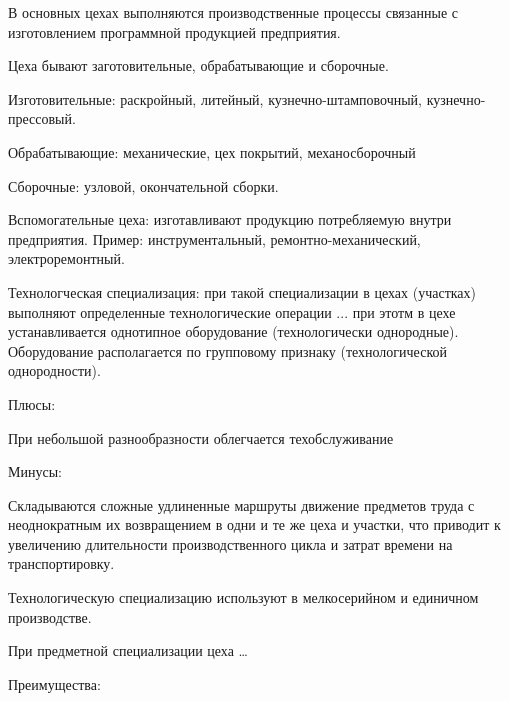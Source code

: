 \documentclass[14pt,a4paper,oneside]{extarticle}
\begin{document}
В основных цехах выполняются производственные процессы связанные с изготовлением программной продукцией предприятия.

Цеха бывают заготовительные, обрабатывающие и сборочные.

Изготовительные: раскройный, литейный, кузнечно-штамповочный, кузнечно-прессовый.

Обрабатывающие: механические, цех покрытий, механосборочный

Сборочные: узловой, окончательной сборки.

Вспомогательные цеха: изготавливают продукцию потребляемую внутри предприятия. Пример: инструментальный, ремонтно-механический, электроремонтный.

Технологческая специализация: при такой специализации в цехах (участках) выполняют определенные технологические операции ... при этотм в цехе устанавливается однотипное оборудование (технологически однородные). Оборудование располагается по групповому признаку (технологической однородности).

Плюсы:

При небольшой разнообразности облегчается техобслуживание

Минусы:

Складываются сложные удлиненные маршруты движение предметов труда с неоднократным их возвращением в одни и те же цеха и участки, что приводит к увеличению длительности производственного цикла и затрат времени на транспортировку.

Технологическую специализацию используют в мелкосерийном и единичном производстве.

При предметной специализации цеха \dots

Преимущества:
\end{document}
